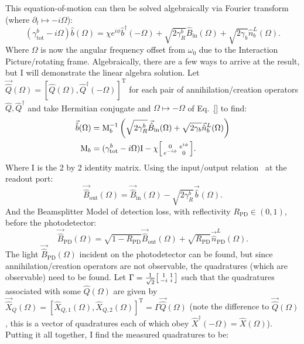 This equation-of-motion can then be solved algebraically via Fourier transform (where $\partial_t \mapsto -i \Omega$): \begin{equation}(\gamma^b_\mathrm{tot}-i \Omega)\hat b(\Omega)=\chi e^{i\phi}\hat b^\dag(-\Omega)  + \sqrt{2\gamma^b_R}\hat{B}_\mathrm{in}(\Omega) + \sqrt{2\gamma_b}\hat{n}^L_b(\Omega).\end{equation} Where $\Omega$ is now the angular frequency offset from $\omega_0$ due to the Interaction Picture/rotating frame. Algebraically, there are a few ways to arrive at the result, but I will demonstrate the linear algebra solution. %
Let $\vec{\hat{Q}}(\Omega)=[\hat{Q}(\Omega),\hat{Q}^\dag(-\Omega)]^\text{T}$ for each pair of annihilation/creation operators $\hat Q, \hat Q^\dag$ and take Hermitian conjugate and $\Omega\mapsto -\Omega$ of Eq.~\ref{} to find: 
\begin{align}\vec{\hat b}(\Omega)&=\text{M}_b^{-1}\left(\sqrt{2\gamma^b_R}\vec{\hat{B}}_\mathrm{in}(\Omega) + \sqrt{2\gamma_b}\vec{\hat{n}}^L_b(\Omega)\right)\\
\text{M}_b&=(\gamma^b_\mathrm{tot}-i \Omega)\text{I}-\chi \begin{bsmallmatrix}0 & e^{i\phi} \\e^{-i\phi} & 0\end{bsmallmatrix}.
\end{align}
Where $\text{I}$ is the 2 by 2 identity matrix. Using the input/output relation~\cite{} at the readout port:  \begin{equation}\label{eq:dOPO_IO_readout}\vec{\hat{B}}_\mathrm{out}(\Omega)=\vec{\hat{B}}_\mathrm{in}(\Omega)-\sqrt{2\gamma^b_R}\vec{\hat b}(\Omega).\end{equation} And the Beamsplitter Model of detection loss, with reflectivity $R_\text{PD}\in(0,1)$, before the photodetector: \begin{equation}\label{eq:dOPO_IO_PD}\vec{\hat{B}}_\mathrm{PD}(\Omega)=\sqrt{1-R_\text{PD}}\vec{\hat{B}}_\mathrm{out}(\Omega)+\sqrt{R_\text{PD}}\vec{\hat n}^L_\text{PD}(\Omega).\end{equation} The light $\vec{\hat{B}}_\mathrm{PD}(\Omega)$ incident on the photodetector can be found, but since annihilation/creation operators are not observable, the quadratures (which are observable) need to be found. Let $\Gamma = \frac{1}{\sqrt2} \begin{bsmallmatrix}1 & 1 \\-i & i\end{bsmallmatrix}$ such that the quadratures associated with some $\hat{Q}(\Omega)$ are given by $\vec{\hat{X}}_Q(\Omega)=[\hat{X}_{Q,1}(\Omega),\hat{X}_{Q,2}(\Omega)]^\text{T}=\Gamma \vec{\hat{Q}}(\Omega)$ (note the difference to $\vec{\hat{Q}}(\Omega)$, this is a vector of quadratures each of which obey $\hat{X}^\dag(-\Omega)=\hat{X}(\Omega)$). Putting it all together, I find the measured quadratures to be: 
